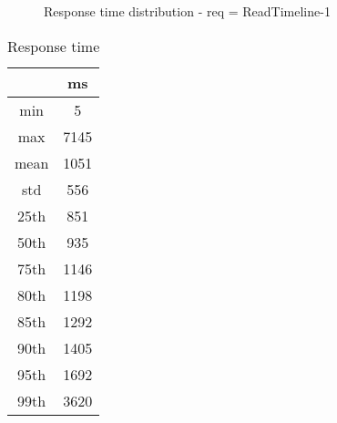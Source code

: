 \begin{minipage}{0.75\linewidth}
\begin{figure}[h]
\begin{adjustbox}{max width=1.0\linewidth, keepaspectratio}
  \end{adjustbox}
  \caption{Response time distribution - req = ReadTimeline-1}
\end{figure}
\end{minipage}\hfill\begin{minipage}{0.18\linewidth}
\begin{table}[h]
\begin{tabular}{|cc|}
\hline
\textbf{} & \textbf{ms}\\ \hline
 \Xhline{0.005\arrayrulewidth}
min & 5\\
 \Xhline{0.005\arrayrulewidth}
max & 7145\\
 \Xhline{0.005\arrayrulewidth}
mean & 1051\\
 \Xhline{0.005\arrayrulewidth}
std & 556\\
\hline
\hline
 \Xhline{0.005\arrayrulewidth}
25th & 851\\
 \Xhline{0.005\arrayrulewidth}
50th & 935\\
 \Xhline{0.005\arrayrulewidth}
75th & 1146\\
 \Xhline{0.005\arrayrulewidth}
80th & 1198\\
 \Xhline{0.005\arrayrulewidth}
85th & 1292\\
 \Xhline{0.005\arrayrulewidth}
90th & 1405\\
 \Xhline{0.005\arrayrulewidth}
95th & 1692\\
 \Xhline{0.005\arrayrulewidth}
99th & 3620\\
\hline
\end{tabular}
\caption{Response time}
\end{table}
\end{minipage}\hfill